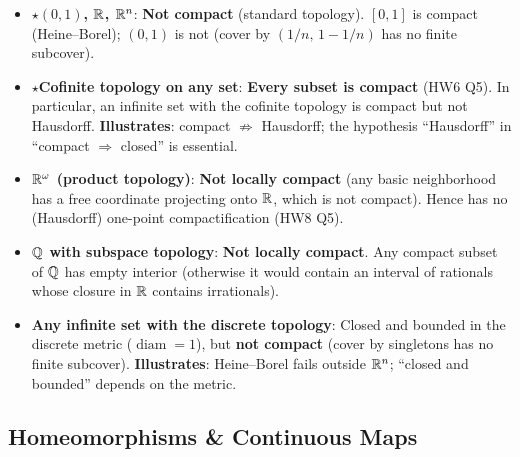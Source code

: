 \documentclass{article}
\newcommand{\starKey}{\textcolor{red!65!black}{\textbf{$\star$}}}
\begin{document}
\begin{itemize}
  \item \starKey \textbf{$(0,1)$, $\mathbb{R}$, $\mathbb{R}^n$}: \textbf{Not compact} (standard topology).
  $[0,1]$ is compact (Heine--Borel); $(0,1)$ is not
  (cover by $(1/n,\,1-1/n)$ has no finite subcover).

  \item \starKey \textbf{Cofinite topology on any set}: \textbf{Every subset is compact}
  (HW6 Q5). In particular, an infinite set with the cofinite topology is compact
  but not Hausdorff. \textbf{Illustrates}: compact $\nRightarrow$ Hausdorff;
  the hypothesis ``Hausdorff'' in ``compact $\Rightarrow$ closed'' is essential.

  \item \textbf{$\mathbb{R}^\omega$ (product topology)}: \textbf{Not locally compact}
  (any basic neighborhood has a free coordinate projecting onto $\mathbb{R}$, which is not compact).
  Hence has no (Hausdorff) one-point compactification (HW8 Q5).

  \item \textbf{$\mathbb{Q}$ with subspace topology}: \textbf{Not locally compact}.
  Any compact subset of $\mathbb{Q}$ has empty interior (otherwise it would contain an interval
  of rationals whose closure in $\mathbb{R}$ contains irrationals).

  \item \textbf{Any infinite set with the discrete topology}:
  Closed and bounded in the discrete metric ($\operatorname{diam}=1$), but
  \textbf{not compact} (cover by singletons has no finite subcover).
  \textbf{Illustrates}: Heine--Borel fails outside $\mathbb{R}^n$; ``closed and bounded''
  depends on the metric.
\end{itemize}

\subsection{Homeomorphisms \& Continuous Maps}
\end{document}
